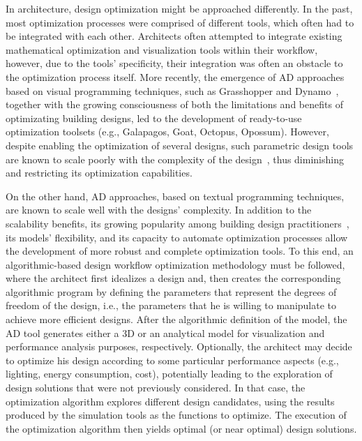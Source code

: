 In architecture, design optimization might be approached differently. In the past, most optimization processes were comprised of different tools, which often had to be integrated with each other. Architects often attempted to integrate existing mathematical optimization and visualization tools within their workflow, however, due to the tools' specificity, their integration was often an obstacle to the optimization process itself. More recently, the emergence of \ac{AD} approaches based on visual programming techniques, such as Grasshopper and Dynamo~\cite{GRASSHOPPER,DYNAMOBIM}, together with the growing consciousness of both the limitations and benefits of optimizating building designs, led to the development of ready-to-use optimization toolsets (e.g., Galapagos, Goat, Octopus, Opossum). However, despite enabling the optimization of several designs, such parametric design tools are known to scale poorly with the complexity of the design~\cite{Heijden2015}, thus diminishing and restricting its optimization capabilities. 

On the other hand, \ac{AD} approaches, based on textual programming techniques, are known to scale well with the designs' complexity. In addition to the scalability benefits, its growing popularity among building design practitioners~\cite{Kestelier2013}, its models' flexibility, and its capacity to automate optimization processes allow the development of more robust and complete optimization tools. To this end, an algorithmic-based design workflow optimization methodology must be followed, where the architect first idealizes a design and, then creates the corresponding algorithmic program by defining the parameters that represent the degrees of freedom of the design, i.e., the parameters that he is willing to manipulate to achieve more efficient designs. After the algorithmic definition of the model, the \ac{AD} tool generates either a 3D or an analytical model for visualization and performance analysis purposes, respectively. Optionally, the architect may decide to optimize his design according to some particular performance aspects (e.g., lighting, energy consumption, cost), potentially leading to the exploration of design solutions that were not previously considered. In that case, the optimization algorithm explores different design candidates, using the results produced by the simulation tools as the functions to optimize. The execution of the optimization algorithm then yields optimal (or near optimal) design solutions.


